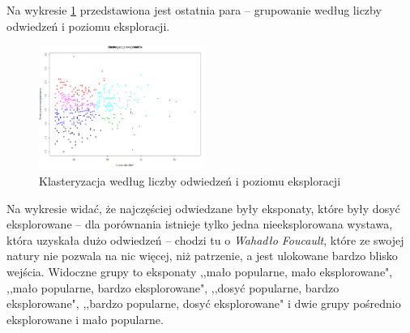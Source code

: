 \documentclass[conference]{IEEEtran}
\begin{document}
Na wykresie \ref{klasteryzacja_odw_zach} przedstawiona jest ostatnia para -- grupowanie według liczby odwiedzeń i poziomu eksploracji.
\begin{figure}[H]
\includegraphics[width=0.48\textwidth]{klasteryzacja_odw_zach.png}
\caption{Klasteryzacja według liczby odwiedzeń i poziomu eksploracji}
\label{klasteryzacja_odw_zach}
\end{figure}
Na wykresie widać, że najczęściej odwiedzane były eksponaty, które były dosyć eksplorowane -- dla porównania istnieje tylko jedna nieeksplorowana wystawa, która uzyskała dużo odwiedzeń -- chodzi tu o \textit{Wahadło Foucault}, które ze swojej natury nie pozwala na nic więcej, niż patrzenie, a jest ulokowane bardzo blisko wejścia. 
Widoczne grupy to eksponaty ,,mało popularne, mało eksplorowane", ,,mało popularne, bardzo eksplorowane", ,,dosyć popularne, bardzo eksplorowane", ,,bardzo popularne, dosyć eksplorowane" i dwie grupy pośrednio eksplorowane i mało popularne.
\end{document}
